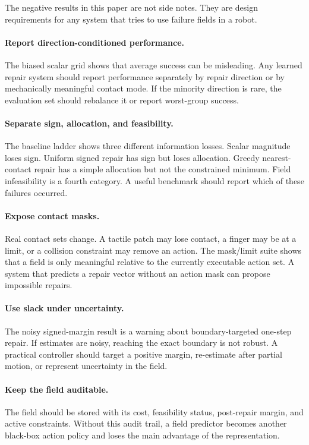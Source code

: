 \documentclass{article}
\begin{document}
The negative results in this paper are not side notes. They are design requirements for any system that tries to use failure fields in a robot.

\paragraph{Report direction-conditioned performance.}
The biased scalar grid shows that average success can be misleading. Any learned repair system should report performance separately by repair direction or by mechanically meaningful contact mode. If the minority direction is rare, the evaluation set should rebalance it or report worst-group success.

\paragraph{Separate sign, allocation, and feasibility.}
The baseline ladder shows three different information losses. Scalar magnitude loses sign. Uniform signed repair has sign but loses allocation. Greedy nearest-contact repair has a simple allocation but not the constrained minimum. Field infeasibility is a fourth category. A useful benchmark should report which of these failures occurred.

\paragraph{Expose contact masks.}
Real contact sets change. A tactile patch may lose contact, a finger may be at a limit, or a collision constraint may remove an action. The mask/limit suite shows that a field is only meaningful relative to the currently executable action set. A system that predicts a repair vector without an action mask can propose impossible repairs.

\paragraph{Use slack under uncertainty.}
The noisy signed-margin result is a warning about boundary-targeted one-step repair. If estimates are noisy, reaching the exact boundary is not robust. A practical controller should target a positive margin, re-estimate after partial motion, or represent uncertainty in the field.

\paragraph{Keep the field auditable.}
The field should be stored with its cost, feasibility status, post-repair margin, and active constraints. Without this audit trail, a field predictor becomes another black-box action policy and loses the main advantage of the representation.



\end{document}
